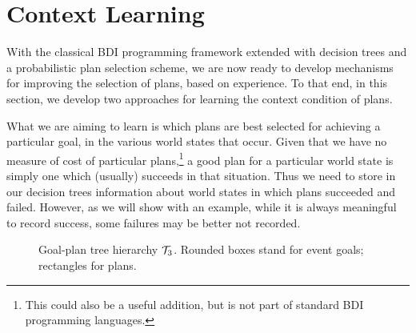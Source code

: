 \section{Context Learning}\label{sec:context_learning}


With the classical BDI programming framework extended with decision
trees and a probabilistic plan selection scheme, we are now ready to
develop mechanisms for improving the selection of plans, based on
experience.
%
To that end, in this section, we develop two approaches for learning
the context condition of plans.

What we are aiming to learn is which plans are best selected for
achieving a particular goal, in the various world states that
occur. Given that we have no measure of cost of particular
plans,\footnote{This could also be a useful addition, but is not part
  of standard BDI programming languages.} a good plan for a
particular world state is simply one which (usually) succeeds in that
situation. Thus we need to store in our decision trees information
about world states in which plans succeeded and failed.  However, as
we will show with an example, while it is always meaningful to record
success, some failures may be better not recorded.

\begin{figure}[t]
\begin{center}

\end{center}
\caption{Goal-plan tree hierarchy ${\mathcal{T}}_3$. Rounded boxes stand for event goals; rectangles for
plans.}
%
\label{fig:T3}
\end{figure}


